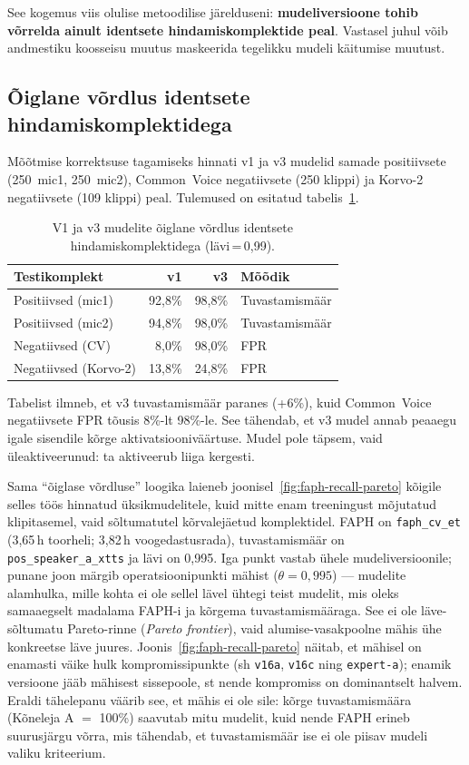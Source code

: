 See kogemus viis olulise metoodilise järelduseni: \textbf{mudeliversioone tohib võrrelda ainult identsete hindamiskomplektide peal}. Vastasel juhul võib andmestiku koosseisu muutus maskeerida tegelikku mudeli käitumise muutust.

\subsection{Õiglane võrdlus identsete hindamiskomplektidega}

Mõõtmise korrektsuse tagamiseks hinnati v1 ja v3 mudelid samade positiivsete (250~mic1, 250~mic2), Common~Voice negatiivsete (250 klippi) ja Korvo-2 negatiivsete (109 klippi) peal. Tulemused on esitatud tabelis~\ref{tab:fair-comparison}.

\begin{table}[H]
\centering
\caption{V1 ja v3 mudelite õiglane võrdlus identsete hindamiskomplektidega (lävi\,=\,0,99).}
\label{tab:fair-comparison}
\begin{tabular}{l r r l}
\hline
\textbf{Testikomplekt} & \textbf{v1} & \textbf{v3} & \textbf{Mõõdik} \\
\hline
Positiivsed (mic1) & 92,8\% & 98,8\% & Tuvastamismäär \\
Positiivsed (mic2) & 94,8\% & 98,0\% & Tuvastamismäär \\
Negatiivsed (CV) & 8,0\% & 98,0\% & FPR \\
Negatiivsed (Korvo-2) & 13,8\% & 24,8\% & FPR \\
\hline
\end{tabular}
\end{table}

Tabelist ilmneb, et v3 tuvastamismäär paranes (+6\%), kuid Common~Voice negatiivsete FPR tõusis 8\%-lt 98\%-le. See tähendab, et v3 mudel annab peaaegu igale sisendile kõrge aktivatsiooniväärtuse. Mudel pole täpsem, vaid üleaktiveerunud: ta aktiveerub liiga kergesti.

Sama \enquote{õiglase võrdluse} loogika laieneb joonisel~\ref{fig:faph-recall-pareto} kõigile selles töös hinnatud üksikmudelitele, kuid mitte enam treeningust mõjutatud klipitasemel, vaid sõltumatutel kõrvalejäetud komplektidel. FAPH on \texttt{faph\_cv\_et} (3,65\,h toorheli; 3,82\,h voogedastusrada), tuvastamismäär on \texttt{pos\_speaker\_a\_xtts} ja lävi on 0,995. Iga punkt vastab ühele mudeliversioonile; punane joon märgib operatsioonipunkti mähist ($\theta=0{,}995$) --- mudelite alamhulka, mille kohta ei ole sellel lävel ühtegi teist mudelit, mis oleks samaaegselt madalama FAPH-i ja kõrgema tuvastamismääraga. See ei ole läve-sõltumatu Pareto-rinne (\emph{Pareto frontier}), vaid alumise-vasakpoolne mähis ühe konkreetse läve juures. Joonis~\ref{fig:faph-recall-pareto} näitab, et mähisel on enamasti väike hulk kompromissipunkte (sh \texttt{v16a}, \texttt{v16c} ning \texttt{expert-a}); enamik versioone jääb mähisest sissepoole, st nende kompromiss on dominantselt halvem. Eraldi tähelepanu väärib see, et mähis ei ole sile: kõrge tuvastamismäära (Kõneleja A $=$ 100\%) saavutab mitu mudelit, kuid nende FAPH erineb suurusjärgu võrra, mis tähendab, et tuvastamismäär ise ei ole piisav mudeli valiku kriteerium.

